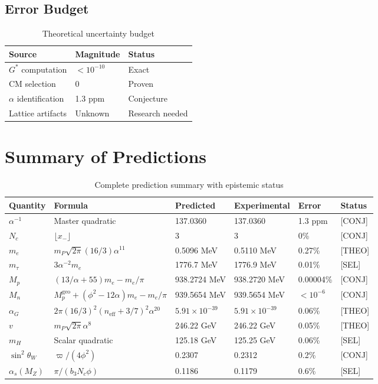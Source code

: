\documentclass[aps,prd,twocolumn,10pt,groupedaddress,superscriptaddress]{revtex4-2}
\begin{document}
\subsection{Error Budget}

\begin{table}[h]
\caption{Theoretical uncertainty budget}
\begin{ruledtabular}
\begin{tabular}{lll}
Source & Magnitude & Status \\
\hline
$G^*$ computation & $<10^{-10}$ & Exact \\
CM selection & 0 & Proven \\
$\alpha$ identification & 1.3 ppm & Conjecture \\
Lattice artifacts & Unknown & Research needed \\
\end{tabular}
\end{ruledtabular}
\end{table}

\section{Summary of Predictions}

\begin{table}[t]
\caption{Complete prediction summary with epistemic status}
\begin{ruledtabular}
\begin{tabular}{llllll}
Quantity & Formula & Predicted & Experimental & Error & Status \\
\hline
$\alpha^{-1}$ & Master quadratic & 137.0360 & 137.0360 & 1.3 ppm & [CONJ] \\
$N_c$ & $\lfloor x_- \rfloor$ & 3 & 3 & 0\% & [CONJ] \\
$m_e$ & $m_P\sqrt{2\pi}(16/3)\alpha^{11}$ & 0.5096 MeV & 0.5110 MeV & 0.27\% & [THEO] \\
$m_\tau$ & $3\alpha^{-2}m_e$ & 1776.7 MeV & 1776.9 MeV & 0.01\% & [SEL] \\
$M_p$ & $(13/\alpha + 55)m_e - m_e/\pi$ & 938.2724 MeV & 938.2720 MeV & 0.00004\% & [CONJ] \\
$M_n$ & $M_p^{\text{geo}} + (\phi^2-12\alpha)m_e - m_e/\pi$ & 939.5654 MeV & 939.5654 MeV & $<10^{-6}$ & [CONJ] \\
$\alpha_G$ & $2\pi(16/3)^2(n_{\text{eff}}+3/7)^2\alpha^{20}$ & $5.91\times10^{-39}$ & $5.91\times10^{-39}$ & 0.06\% & [THEO] \\
$v$ & $m_P\sqrt{2\pi}\alpha^8$ & 246.22 GeV & 246.22 GeV & 0.05\% & [THEO] \\
$m_H$ & Scalar quadratic & 125.18 GeV & 125.25 GeV & 0.06\% & [SEL] \\
$\sin^2\theta_W$ & $\varpi/(4\phi^2)$ & 0.2307 & 0.2312 & 0.2\% & [CONJ] \\
$\alpha_s(M_Z)$ & $\pi/(b_3 N_c \phi)$ & 0.1186 & 0.1179 & 0.6\% & [SEL] \\
\end{tabular}
\end{ruledtabular}
\end{table}
\end{document}
